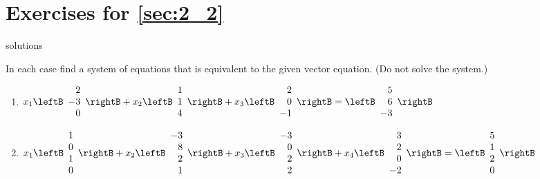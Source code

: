 \section*{Exercises for \ref{sec:2_2}}

\begin{Filesave}{solutions}
\end{Filesave}

\begin{multicols}{2}
\begin{ex}
In each case find a system of equations that is equivalent to the given vector equation. (Do not solve the system.)


\begin{enumerate}[leftmargin=1em,label={\alph*.}]
\item {\footnotesize $x_{1} \leftB \begin{array}{r}
2 \\
-3 \\
0
\end{array} \rightB + x_{2} \leftB \begin{array}{r}
1 \\
1 \\
4
\end{array} \rightB + x_{3} \leftB \begin{array}{r}
2 \\
0 \\
-1
\end{array} \rightB = \leftB \begin{array}{r}
5 \\
6 \\
-3
\end{array} \rightB$}

\item 
{\scriptsize $x_{1} \leftB \begin{array}{r}
1 \\
0 \\
1 \\
0
\end{array} \rightB + x_{2} \leftB \begin{array}{r}
-3 \\
8 \\
2 \\
1
\end{array} \rightB + x_{3} \leftB \begin{array}{r}
-3 \\
0 \\
2 \\
2
\end{array} \rightB + x_{4} \leftB \begin{array}{r}
3 \\
2 \\
0 \\
-2
\end{array} \rightB = \leftB \begin{array}{r}
5 \\
1 \\
2 \\
0
\end{array} \rightB$}



\end{enumerate}
\end{ex}
\end{multicols}
